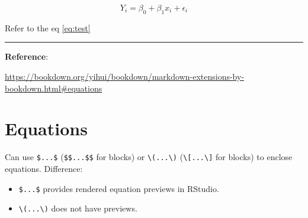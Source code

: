 \documentclass[
  a4paper,
  twoside,
  openright]{book}
\newenvironment{Shaded}{\begin{snugshade}}{\end{snugshade}}
\newcommand{\ExtensionTok}[1]{#1}
\newcommand{\KeywordTok}[1]{\textcolor[rgb]{0.13,0.29,0.53}{\textbf{#1}}}
\newcommand{\NormalTok}[1]{#1}
\newcommand{\SpecialCharTok}[1]{\textcolor[rgb]{0.81,0.36,0.00}{\textbf{#1}}}
\newcommand{\SpecialStringTok}[1]{\textcolor[rgb]{0.31,0.60,0.02}{#1}}
\providecommand{\tightlist}{%
  \setlength{\itemsep}{0pt}\setlength{\parskip}{0pt}}
\theoremstyle{definition}
\theoremstyle{definition}
\theoremstyle{definition}
\theoremstyle{definition}
\theoremstyle{remark}
\begin{document}
\begin{enumerate}
\begin{Shaded}
\end{Shaded}

  \begin{equation} \label{eq:test} \tag{my label}
  Y_i = \beta_0 + \beta_1 x_i + \epsilon_i
  \end{equation}

  Refer to the eq \eqref{eq:test}
\end{enumerate}

\begin{center}\rule{0.5\linewidth}{0.5pt}\end{center}

\textbf{Reference}:

\url{https://bookdown.org/yihui/bookdown/markdown-extensions-by-bookdown.html\#equations}

\section{Equations}\label{equations}

Can use \texttt{\$...\$} (\texttt{\$\$...\$\$} for blocks) or \texttt{\textbackslash{}(...\textbackslash{})} (\texttt{\textbackslash{}{[}...\textbackslash{}{]}} for blocks) to enclose equations. Difference:

\begin{itemize}
\tightlist
\item
  \texttt{\$...\$} provides rendered equation previews in RStudio.
\item
  \texttt{\textbackslash{}(...\textbackslash{})} does not have previews.
\end{itemize}
\end{document}
